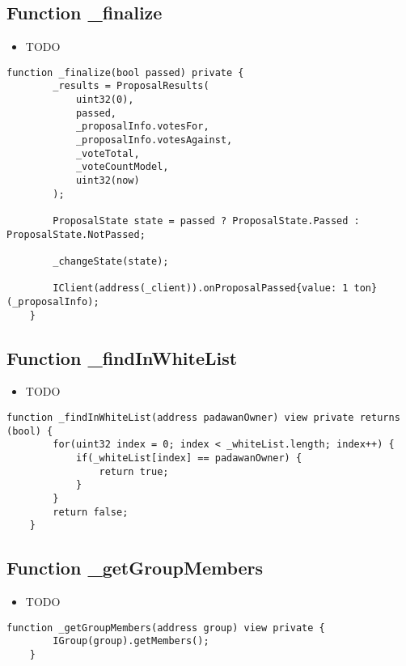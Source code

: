 \subsection{Function \_{}finalize}

\begin{itemize}
\item TODO
\end{itemize}

\begin{lstlisting}[firstnumber=112]
    function _finalize(bool passed) private {
        _results = ProposalResults(
            uint32(0),
            passed,
            _proposalInfo.votesFor,
            _proposalInfo.votesAgainst,
            _voteTotal,
            _voteCountModel,
            uint32(now)
        );

        ProposalState state = passed ? ProposalState.Passed : ProposalState.NotPassed;

        _changeState(state);

        IClient(address(_client)).onProposalPassed{value: 1 ton} (_proposalInfo);
    }
\end{lstlisting}

\subsection{Function \_{}findInWhiteList}

\begin{itemize}
\item TODO
\end{itemize}

\begin{lstlisting}[firstnumber=224]
    function _findInWhiteList(address padawanOwner) view private returns (bool) {
        for(uint32 index = 0; index < _whiteList.length; index++) {
            if(_whiteList[index] == padawanOwner) {
                return true;
            }
        }
        return false;
    }
\end{lstlisting}

\subsection{Function \_{}getGroupMembers}

\begin{itemize}
\item TODO
\end{itemize}

\begin{lstlisting}[firstnumber=233]
    function _getGroupMembers(address group) view private {
        IGroup(group).getMembers();
    }
\end{lstlisting}

